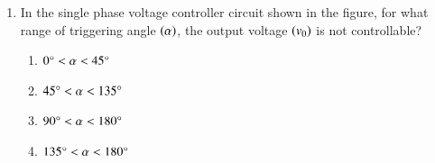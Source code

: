 \documentclass[journal]{IEEEtran}
\begin{document}
\begin{enumerate}
\begin{enumerate}
\end{enumerate}
\item In the single phase voltage controller circuit shown in the figure, for what range of triggering angle $\left(\alpha\right)$, the output voltage $\left(v_0\right)$ is not controllable?
\begin{figure}[!ht]
\centering
\resizebox{0.5\textwidth}{!}{%

}%
\end{figure}
\begin{enumerate}
    \item $0\degree < \alpha < 45\degree$
    \item $45\degree < \alpha < 135\degree$
    \item $90\degree < \alpha < 180\degree$
    \item $135\degree < \alpha < 180\degree$ \\
\end{enumerate}
			 \end{enumerate}
			 
\end{document}

